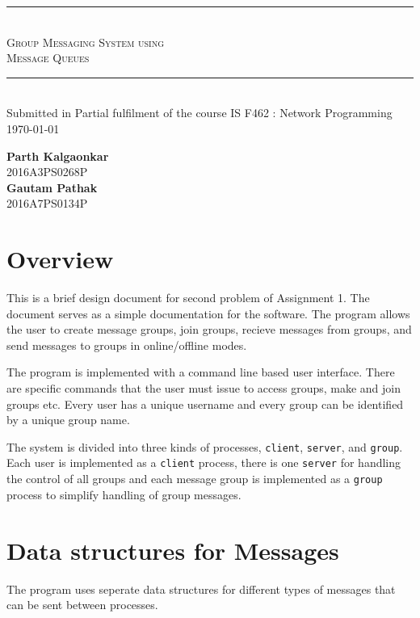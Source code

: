\documentclass{article}
\begin{document}
\vspace*{3cm}
\begin{center}
\rule{350pt}{1pt}\\
[3mm]
\textsc{\huge Group Messaging System using}\\
\vspace{1mm}
\textsc{\huge Message Queues}
\rule{350pt}{1pt}\\
\vspace{5cm}
Submitted in Partial fulfilment of the course IS F462 : Network Programming\\
\vspace{1cm}
\today
\end{center}

\vspace{5cm}
\begin{flushright}
\large{\bfseries Parth Kalgaonkar}\\
2016A3PS0268P\\
\large{\bfseries Gautam Pathak}\\
2016A7PS0134P
\end{flushright}

\newpage
{}

\section{Overview}
This is a brief design document for second problem of Assignment 1. The document serves as a simple documentation for the software. The program allows the user to create message groups, join groups, recieve messages from groups, and send messages to groups in online/offline modes. 

The program is implemented with a command line based user interface. There are specific commands that the user must issue to access groups, make and join groups etc. Every user has a unique username and every group can be identified by a unique group name. 

The system is divided into three kinds of processes, \lstinline{client}, \lstinline{server}, and \lstinline{group}. Each user is implemented as a \lstinline{client} process, there is one \lstinline{server} for handling the control of all groups and each message group is implemented as a \lstinline{group} process to simplify handling of group messages. 

\section{Data structures for Messages}
The program uses seperate data structures for different types of messages that can be sent between processes.
\end{document}
